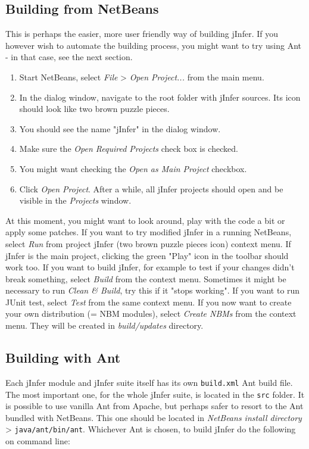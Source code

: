 \documentclass[a4paper,10pt,oneside]{article}
\begin{document}
\subsection*{Building from NetBeans}
\par 
  This is perhaps the easier, more user friendly way of building jInfer.
    If you however wish to automate the building process, you might want to
    try using Ant - in that case, see the next section.

\begin{enumerate}\item 
 Start NetBeans, select \textit{File} > \textit{Open Project...} from the main menu.
  \item In the dialog window, navigate to the root folder with jInfer sources.
    Its icon should look like two brown puzzle pieces.
  \item You should see the name "jInfer" in the dialog window.
  \item Make sure the \textit{Open Required Projects} check box is checked.
  \item You might want checking the \textit{Open as Main Project} checkbox.
  \item Click \textit{Open Project}. After a while, all jInfer projects should
    open and be visible in the \textit{Projects} window.
  \end{enumerate}\par At this moment, you might want to look around, play with the
  code a bit or apply some patches. If you want to try modified jInfer in a
  running NetBeans, select \textit{Run} from project jInfer (two brown puzzle
  pieces icon) context menu. If jInfer is the main project, clicking the
  green "Play" icon in the toolbar should work too.
  If you want to build jInfer, for example to test if your changes didn't break
  something, select \textit{Build} from the context menu. Sometimes it might be
  necessary to run \textit{Clean \& Build}, try this if it "stops working".
  If you want to run JUnit test, select \textit{Test} from the same context menu.
  If you now want to create your own distribution (= NBM modules), select
  \textit{Create NBMs} from the context menu. They will be created in
  \textit{build/updates} directory.
\subsection*{Building with Ant}
\par 
  Each jInfer module and jInfer suite itself has
  its own \texttt{build.xml} Ant build file. The most important one, for the
  whole jInfer suite, is located in the \texttt{src} folder.
  It is possible to use vanilla Ant from Apache, but perhaps safer to resort
  to the Ant bundled with NetBeans. This one should be located in \textit{NetBeans
    install directory} > \texttt{java/ant/bin/ant}.
  Whichever Ant is chosen, to build jInfer do the following on command line:
\end{document}
